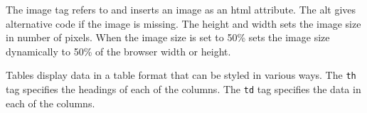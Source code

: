 \documentclass[]{book}
\newenvironment{Shaded}{\begin{snugshade}}{\end{snugshade}}
\newcommand{\ExtensionTok}[1]{#1}
\newcommand{\NormalTok}[1]{#1}
\newcommand{\OperatorTok}[1]{\textcolor[rgb]{0.81,0.36,0.00}{\textbf{#1}}}
\newcommand{\StringTok}[1]{\textcolor[rgb]{0.31,0.60,0.02}{#1}}
\begin{document}
The image tag refers to and inserts an image as an html attribute.
The alt gives alternative code if the image is missing.
The height and width sets the image size in number of pixels.
When the image size is set to 50\% sets the image size dynamically to 50\% of the browser width or height.

\begin{Shaded}
\end{Shaded}

Tables display data in a table format that can be styled in various ways.
The \texttt{th} tag specifies the headings of each of the columns.
The \texttt{td} tag specifies the data in each of the columns.
\end{document}
